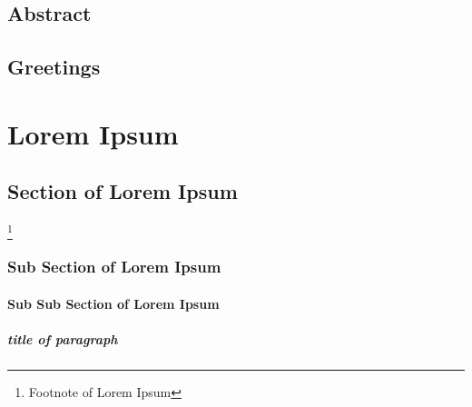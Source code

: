 \documentclass[12pt, a4paper]{report}
\begin{document}
	\tahomafont

	\makeutbmfrontcover{}
 
	\section*{Abstract}
	\lipsum[1-3]
	
	\newpage

	\section*{Greetings}
	\lipsum[1-2] 

	\tableofcontents
	\newpage

	\chapter{Lorem Ipsum}
	\section{Section of Lorem Ipsum}
	\lipsum[1-1]\footnote{Footnote of Lorem Ipsum}

	\subsection{Sub Section of Lorem Ipsum}
	\lipsum[1-1]

	\subsubsection{Sub Sub Section of Lorem Ipsum}
	\paragraph{title of paragraph}
	\lipsum[1-1]

	\paragraph{}
	\lipsum[1-1]

	\newpage

	\nocite{*}
	\printbibliography{}

	\makeutbmbackcover{}
\end{document}
